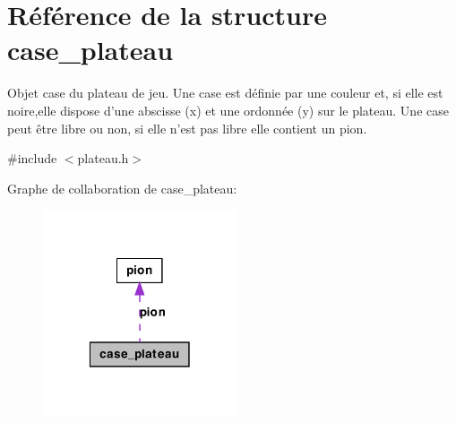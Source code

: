 \hypertarget{structcase__plateau}{
\section{Référence de la structure case\_\-plateau}
\label{structcase__plateau}
}


Objet case du plateau de jeu. Une case est définie par une couleur et, si elle est noire,elle dispose d'une abscisse (x) et une ordonnée (y) sur le plateau. Une case peut être libre ou non, si elle n'est pas libre elle contient un pion.  




{\ttfamily \#include $<$plateau.h$>$}



Graphe de collaboration de case\_\-plateau:\nopagebreak
\begin{figure}[H]
\begin{center}
\leavevmode
\includegraphics[width=162pt]{structcase__plateau__coll__graph}
\end{center}
\end{figure}
